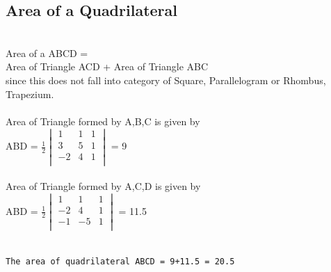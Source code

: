 \documentclass[journal,12pt,twocolumn]{IEEEtran}
\begin{document}
\subsection{Area of a Quadrilateral}
\\
Area of a \Box ABCD = \\Area of Triangle \Delta ACD + Area of Triangle \Delta ABC \\

since this does not fall into category of Square, Parallelogram or Rhombus, Trapezium.
\\
\\
Area of Triangle formed by
A,B,C is given by\\
\Delta ABD = 
\begin{math}
\frac{1}{2}
\begin{vmatrix}
1 & 1 & 1\\3 & 5 & 1\\-2 & 4 & 1\\
\end{vmatrix}
\end{math}
= 9\\
\\
Area of Triangle formed by
A,C,D is given by\\
\Delta ABD = 
\begin{math}
\frac{1}{2}
\begin{vmatrix}
1 & 1 & 1\\-2 & 4 & 1\\-1 & -5 & 1\\
\end{vmatrix}
\end{math}
= 11.5\\
\\
\begin{lstlisting}
The area of quadrilateral ABCD = 9+11.5 = 20.5
\end{lstlisting}
\end{document}
